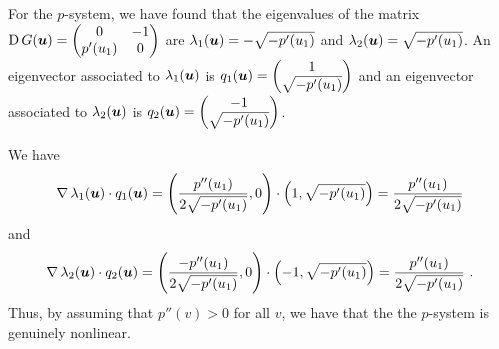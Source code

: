 \begin{egg}  \label{eggPsystem3}
For the $p$-system, we have found that the eigenvalues of the matrix
$\displaystyle \operatorname{D} G({\bm{u}}) = \begin{pmatrix} 0 & -1 \\
p'(u_1) & 0 \end{pmatrix}$ are
$\lambda_1({\bm{u}}) = -\sqrt{-p'(u_1)}$ and
$\lambda_2({\bm{u}}) = \sqrt{-p'(u_1)}$.  An eigenvector associated to 
$\lambda_1({\bm{u}})$ is
$\displaystyle q_1({\bm{u}}) = \begin{pmatrix} 1 \\ \sqrt{-p'(u_1)}
\end{pmatrix}$ and an eigenvector associated to
$\lambda_2({\bm{u}})$ is
$\displaystyle q_2({\bm{u}}) = \begin{pmatrix} -1 \\ \sqrt{-p'(u_1)}
\end{pmatrix}$.

We have
\[
\operatorname{\nabla} \lambda_1({\bm{u}}) \cdot q_1({\bm{u}}) =
\left( \frac{p''(u_1)}{2 \sqrt{-p'(u_1)}} , 0 \right)
\cdot \left( 1 , \sqrt{-p'(u_1)} \right) = \frac{p''(u_1)}{2 \sqrt{-p'(u_1)}} 
\]
and
\[
\operatorname{\nabla} \lambda_2({\bm{u}}) \cdot q_2({\bm{u}}) =
\left( \frac{-p''(u_1)}{2 \sqrt{-p'(u_1)}} , 0 \right)
\cdot \left( -1 , \sqrt{-p'(u_1)} \right) = \frac{p''(u_1)}{2 \sqrt{-p'(u_1)}} 
\ .
\]
Thus, by assuming that $p''(v) >0$ for all $v$, we have that the
the $p$-system is genuinely nonlinear.
\end{egg}

